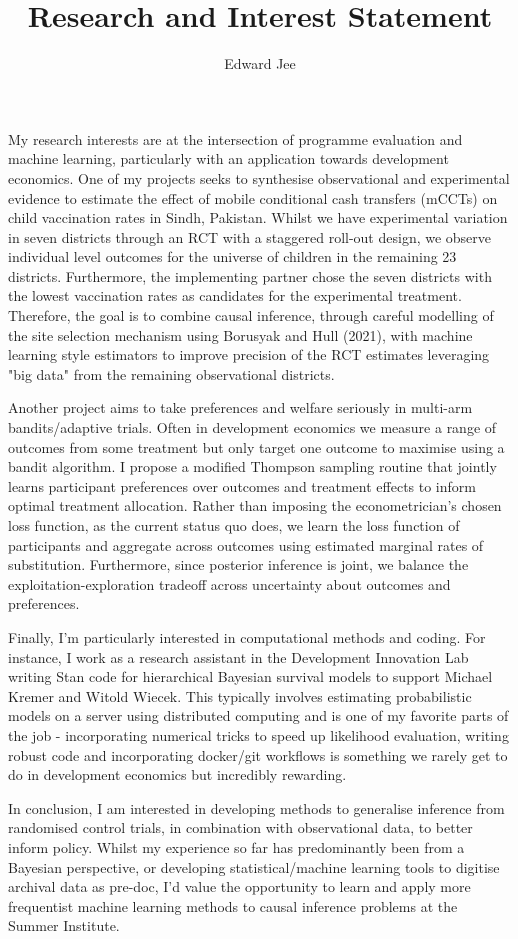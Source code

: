 \documentclass{article}
\author{Edward Jee}
\title{Research and Interest Statement}
\begin{document}
\maketitle

My research interests are at the intersection of programme evaluation and machine 
learning, particularly with an application towards development economics. One 
of my projects seeks to synthesise observational and experimental evidence to 
estimate the effect of mobile conditional cash transfers (mCCTs) on 
child vaccination rates in Sindh, Pakistan. Whilst we have experimental variation 
in seven districts through an RCT with a staggered roll-out design, we observe 
individual level outcomes for 
the universe of children in the remaining 23 districts. Furthermore, the implementing 
partner chose the seven districts with the lowest vaccination rates as candidates 
for the experimental treatment. Therefore, the goal is to combine causal inference, 
through careful modelling of the site selection mechanism using Borusyak and Hull (2021), 
with machine learning style estimators to improve precision of the RCT estimates 
leveraging "big data" from the remaining observational districts.



Another project aims to take preferences and welfare seriously in multi-arm 
bandits/adaptive trials. Often in development economics we measure a range of 
outcomes from some treatment but only target one outcome to maximise using a 
bandit algorithm. I propose a modified Thompson sampling routine that jointly 
learns participant preferences over outcomes and treatment effects to inform optimal treatment 
allocation. Rather than imposing the econometrician's chosen loss function, as 
the current status quo does, we learn the loss function of participants and 
aggregate across outcomes using estimated marginal rates of substitution. Furthermore, 
since posterior inference is joint, we balance the exploitation-exploration 
tradeoff across uncertainty about outcomes and preferences.


Finally, I'm particularly interested in computational methods and coding. For instance, I work 
as a research assistant in the Development Innovation Lab writing Stan code for 
hierarchical Bayesian survival models to support Michael Kremer and Witold Wiecek. 
This typically involves estimating  probabilistic models on a server using 
distributed computing and is one of my favorite parts of the job - incorporating 
numerical tricks to speed up likelihood evaluation, writing robust code and 
incorporating docker/git workflows is something we rarely get to do in development 
economics but incredibly rewarding.
 

In conclusion, I am interested in developing methods to generalise inference from 
randomised control trials, in combination with observational data, to better inform 
policy. Whilst my experience so far has predominantly been from a Bayesian perspective, 
or developing statistical/machine learning tools to digitise archival data as pre-doc,
I'd value the opportunity to learn and apply more frequentist machine learning methods 
to causal inference problems at the Summer Institute.



    
\end{document}

